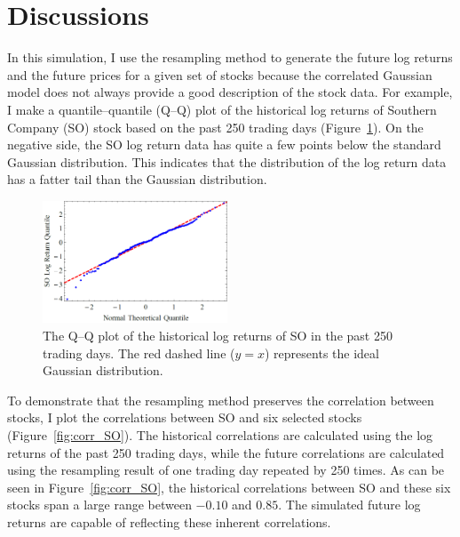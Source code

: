 \documentclass[letterpaper,11pt]{article}
\begin{document}
\section{Discussions}

In this simulation, I use the resampling method to generate the future log returns and the future prices for a given set of stocks because the correlated Gaussian model does not always provide a good description of the stock data.
For example, I make a quantile--quantile (Q--Q) plot of the historical log returns of Southern Company (SO) stock based on the past 250 trading days (Figure~\ref{fig:qqplot_SO}).
On the negative side, the SO log return data has quite a few points below the standard Gaussian distribution.
This indicates that the distribution of the log return data has a fatter tail than the Gaussian distribution.

\begin{figure}[h]
\centering
\includegraphics[width=0.49\textwidth]{qqplot_SO.png}
\caption{The Q--Q plot of the historical log returns of SO in the past 250 trading days.
The red dashed line ($y=x$) represents the ideal Gaussian distribution.}
\label{fig:qqplot_SO}
\end{figure}

To demonstrate that the resampling method preserves the correlation between stocks, I plot the correlations between SO and six selected stocks (Figure~\ref{fig:corr_SO}).
The historical correlations are calculated using the log returns of the past 250 trading days, while the future correlations are calculated using the resampling result of one trading day repeated by 250 times.
As can be seen in Figure~\ref{fig:corr_SO}, the historical correlations between SO and these six stocks span a large range between $-0.10$ and $0.85$.
The simulated future log returns are capable of reflecting these inherent correlations.
\end{document}
